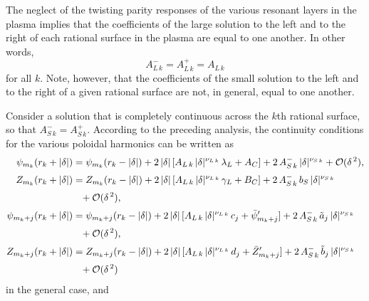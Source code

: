 \documentclass[12pt,prb,aps]{revtex4-1}
\begin{document}
The neglect of the twisting parity responses of the various resonant layers in the plasma implies that the coefficients of the large solution to the left and to the right of
each rational surface in the plasma are equal to one another.\cite{am1} In other words,
\begin{equation}\label{tear}
A_{L\,k}^- = A_{L\,k}^+= A_{L\,k}
\end{equation}
for all $k$. 
 Note, however, that the coefficients of the small solution to the left and to the right of a given rational surface are not, in general, equal to one another. 

Consider a solution that is completely continuous across the $k$th rational surface, so that $A_{S\,k}^-=A_{S\,k}^+$. According to the
preceding analysis, the continuity conditions for the various poloidal harmonics can be written as
\begin{align}\label{c1}
\psi_{m_k}(r_k+|\delta|) &= \psi_{m_k}(r_k-|\delta|) + 2\,|\delta|\,[A_{L\,k}\,|\delta|^{\nu_{L\,k}}\,\lambda_L + A_C] + 2\,A_{S\,k}^-\,|\delta|^{\nu_{S\,k}}+ {\cal O}(\delta^{\,2}),\\[0.5ex]
Z_{m_k} (r_k+|\delta|) &=  Z_{m_k}(r_k-|\delta|) + 2\,|\delta|\,[A_{L\,k}\,|\delta|^{\nu_{L\,k}}\,\gamma_L + B_C] + 2\,A_{S\,k}^-\,b_S\,|\delta|^{\nu_{S\,k}} 
\nonumber\\[0.5ex]&\phantom{=}+ {\cal O}(\delta^{\,2}),\\[0.5ex]
\psi_{m_k+j}(r_k+|\delta|) &= \psi_{m_k+j}(r_k-|\delta|) +2\,|\delta|\,[A_{L\,k}\,|\delta|^{\nu_{L\,k}}\,c_j + \bar{\psi}_{m_k+j}'] + 2\,A_{S\,k}^-\,\tilde{a}_j\,|\delta|^{\nu_{S\,k}}\nonumber\\[0.5ex]&\phantom{=} +{\cal O}(\delta^{\,2}),\\[0.5ex]
Z_{m_k+j}(r_k+|\delta|) &= Z_{m_k+j}(r_k-|\delta|) +2\,|\delta|\,[A_{L\,k}\,|\delta|^{\nu_{L\,k}}\,d_j + \bar{Z}_{m_k+j}'] + 2\,A_{S\,k}^-\,\tilde{b}_j\,|\delta|^{\nu_{S\,k}}
\nonumber\\[0.5ex]&\phantom{=}+ {\cal O}(\delta^{\,2})
\end{align}
in the general case, and 
\end{document}
